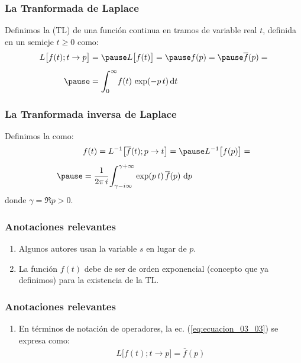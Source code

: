\begin{frame}
\frametitle{La Tranformada de Laplace}
Definimos la  (TL) de una función continua en tramos de variable real $t$, definida en un semieje $t \geq 0$ como:
\pause
\begin{eqnarray}
\begin{aligned}
L \big[ f (t); t \to p \big] &= \pause L \big[ f (t) \big] = \pause f (p) = \pause \overline{f} (p) = \\[0.5em] \pause
&= \scaleint{6ex}_{\bs 0}^{\infty} f (t) \, \exp(-p \, t) \dd{t}
\end{aligned}
\label{eq:ecuacion_03_03}
\end{eqnarray}
\end{frame}
\begin{frame}
\frametitle{La Tranformada inversa de Laplace}
Definimos la  como:
\pause
\begin{eqnarray}
\begin{aligned}
&f (t) = L^{-1} \big[ \overline{f}(t); p \to t \big] = \pause L^{-1} \big[ f (p) \big] = \\[0.5em] \pause
&= \dfrac{1}{2 \pi \, i} \scaleint{6ex}_{\bs \gamma-i \infty}^{\gamma+\infty} \exp(p \, t) \, \overline{f} (p) \, \dd{p}
\end{aligned}
\label{eq:ecuacion_03_04}
\end{eqnarray}
donde $\gamma = \Re{p} > 0$.
\end{frame}
\begin{frame}
\frametitle{Anotaciones relevantes}
\begin{enumerate}[<+->]
\item Algunos autores usan la variable $s$ en lugar de $p$.
\item La función $f (t)$ debe de ser de orden exponencial (concepto que ya definimos) para la existencia de la TL.
\seti
\end{enumerate}
\end{frame}
\begin{frame}
\frametitle{Anotaciones relevantes}
\begin{enumerate}[<+->]
\conti
\item En términos de notación de operadores, la ec. (\ref{eq:ecuacion_03_03}) se expresa como:
\pause
\begin{align}
L \big[ f (t); t \to p \big] = \overline{f} (p) 
\label{eq:ecuacion_03_05}
\end{align}
\end{enumerate}
\end{frame}
